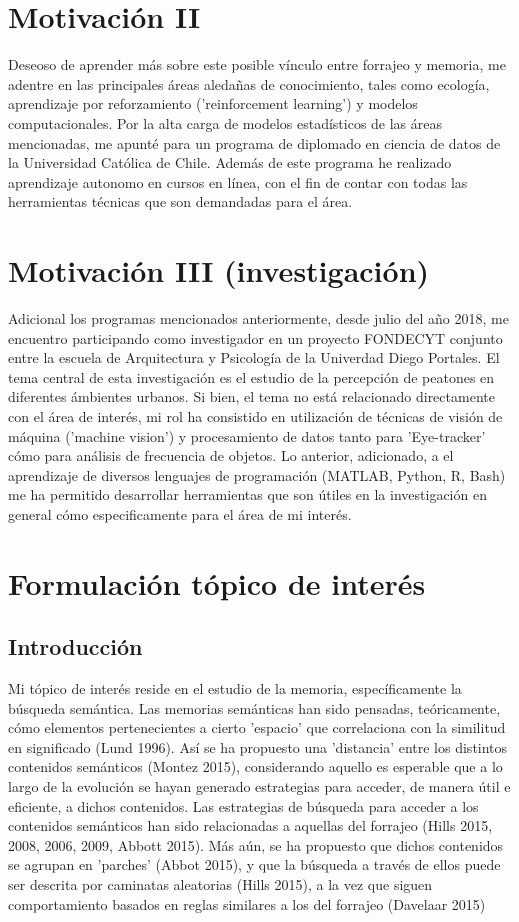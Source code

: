 \documentclass[11pt]{article}
\begin{document}
\section{Motivación II}
\label{sec:org39a96a3}
Deseoso de aprender más sobre este posible vínculo entre forrajeo y
memoria, me adentre en las principales áreas aledañas de conocimiento,
tales como ecología, aprendizaje por reforzamiento ('reinforcement
learning') y modelos computacionales. Por la alta carga de modelos
estadísticos de las áreas mencionadas, me apunté para un programa de
diplomado en ciencia de datos de la Universidad Católica de
Chile. Además de este programa he realizado aprendizaje autonomo en
cursos en línea, con el fin de contar con todas las herramientas
técnicas que son demandadas para el área.
\section{Motivación III (investigación)}
\label{sec:org64c9ec5}
Adicional los programas mencionados anteriormente, desde julio del año
2018, me encuentro participando como investigador en un proyecto
FONDECYT conjunto entre la escuela de Arquitectura y Psicología de la
Univerdad Diego Portales. El tema central de esta investigación es el
estudio de la percepción de peatones en diferentes ámbientes
urbanos. Si bien, el tema no está relacionado directamente con el área
de interés, mi rol ha consistido en utilización de técnicas de visión
de máquina ('machine vision') y procesamiento de datos tanto para
'Eye-tracker' cómo para análisis de frecuencia de objetos. Lo
anterior, adicionado, a el aprendizaje de diversos lenguajes de
programación (MATLAB, Python, R, Bash) me ha permitido desarrollar
herramientas que son útiles en la investigación en general cómo
especificamente para el área de mi interés.
\section{Formulación tópico de interés}
\label{sec:orgf423dae}
\subsection{Introducción}
\label{sec:org56f7ab9}
Mi tópico de interés reside en el estudio de la memoria,
específicamente la búsqueda semántica. Las memorias semánticas han
sido pensadas, teóricamente, cómo elementos pertenecientes a cierto
'espacio' que correlaciona con la similitud en significado (Lund
1996). Así se ha propuesto una 'distancia' entre los distintos
contenidos semánticos (Montez 2015), considerando aquello es esperable
que a lo largo de la evolución se hayan generado estrategias para
acceder, de manera útil e eficiente, a dichos contenidos. Las
estrategias de búsqueda para acceder a los contenidos semánticos han
sido relacionadas a aquellas del forrajeo (Hills 2015, 2008, 2006,
2009, Abbott 2015). Más aún, se ha propuesto que dichos contenidos se
agrupan en 'parches' (Abbot 2015), y que la búsqueda a través de ellos
puede ser descrita por caminatas aleatorias (Hills 2015), a la vez que
siguen comportamiento basados en reglas similares a los del forrajeo
(Davelaar 2015)
\end{document}
